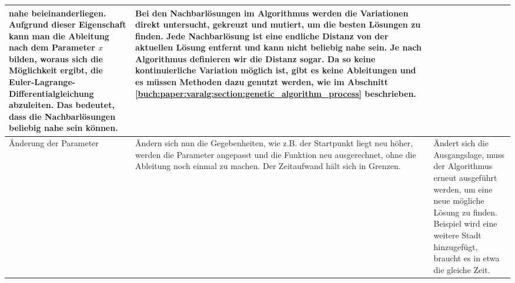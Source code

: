 \begin{xltabular}{\textwidth}{|L|X|X|}
  nahe beieinanderliegen. Aufgrund dieser Eigenschaft kann man die Ableitung nach dem
  Parameter \(x\) bilden, woraus sich die Möglichkeit ergibt, die Euler-Lagrange-Differentialgleichung
  abzuleiten. Das bedeutet, dass die Nachbarlösungen beliebig nahe sein können.  
  & 
  Bei den Nachbarlösungen im Algorithmus werden die Variationen direkt untersucht,
  gekreuzt und mutiert, um die besten Lösungen zu finden. Jede Nachbarlösung 
  ist eine endliche Distanz von der aktuellen Lösung entfernt und kann nicht beliebig 
  nahe sein. Je nach Algorithmus definieren wir die Distanz sogar.
  Da so keine kontinuierliche Variation möglich ist, gibt es keine Ableitungen
  und es müssen Methoden dazu genutzt werden, wie im Abschnitt 
  \ref{buch:paper:varalg:section:genetic_algorithm_process} beschrieben.
  \\ \hline
  Änderung der Parameter
  & 
  Ändern sich nun die Gegebenheiten, wie z.B. der Startpunkt liegt neu höher, werden die Parameter 
  angepasst und die Funktion neu ausgerechnet, ohne die Ableitung noch einmal zu machen. Der Zeitaufwand
  hält sich in Grenzen.
  & 
  Ändert sich die Ausgangslage, muss der Algorithmus erneut ausgeführt werden, um eine
  neue mögliche Lösung zu finden. Beispiel wird eine weitere Stadt hinzugefügt, braucht
  es in etwa die gleiche Zeit.
  \\ \hline
\end{xltabular}